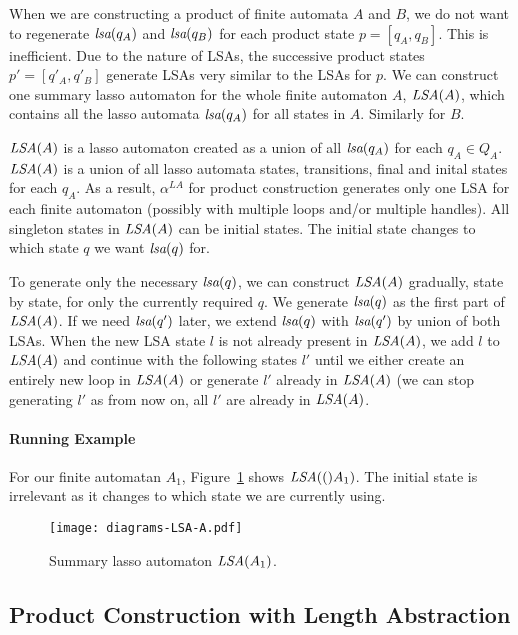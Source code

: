 When we are constructing a product of finite automata $A$ and $B$, we do not want to regenerate $\emph{lsa}(q_A)$ and $\emph{lsa}(q_B)$ for each product state $p = [q_A, q_B]$. This is inefficient. Due to the nature of LSAs, the successive product states $p' = [q'_A, q'_B]$ generate LSAs very similar to the LSAs for $p$. We can construct one summary lasso automaton for the whole finite automaton $A$, $\emph{LSA}(A)$, which contains all the lasso automata $\emph{lsa}(q_A)$ for all states in $A$. Similarly for $B$.

$\emph{LSA}(A)$ is a lasso automaton created as a union of all $\emph{lsa}(q_A)$ for each $q_A \in Q_A$. $\emph{LSA}(A)$ is a union of all lasso automata states, transitions, final and inital states for each $q_A$. As a result, $\alpha^{LA}$ for product construction generates only one LSA for each finite automaton (possibly with multiple loops and/or multiple handles). All singleton states in $\emph{LSA}(A)$ can be initial states. The initial state changes to which state $q$ we want $\emph{lsa}(q)$ for.

To generate only the necessary $\emph{lsa}(q)$, we can construct $\emph{LSA}(A)$ gradually, state by state, for only the currently required $q$. We generate $\emph{lsa}(q)$ as the first part of $\emph{LSA}(A)$. If we need $\emph{lsa}(q')$ later, we extend $\emph{lsa}(q)$ with $\emph{lsa}(q')$ by union of both LSAs. When the new LSA state $l$ is not already present in $\emph{LSA}(A)$, we add $l$ to $\emph{LSA}(A)$ and continue with the following states $l'$ until we either create an entirely new loop in $\emph{LSA}(A)$ or generate $l'$ already in $\emph{LSA}(A)$ (we can stop generating $l'$ as from now on, all $l'$ are already in $\emph{LSA}(A)$.

\paragraph{Running Example}

For our finite automatan $A_1$, Figure~\ref{fig:NFA_A1_LSA_A} shows $\emph{LSA}(()A_1)$. The initial state is irrelevant as it changes to which state we are currently using.

\begin{figure}[ht]
	\centering
	\texttt{[image: diagrams-LSA-A.pdf]}
	\caption{Summary lasso automaton $\emph{LSA}(A_1)$.}
	\label{fig:NFA_A1_LSA_A}
\end{figure}

\subsection{Product Construction with Length Abstraction}

